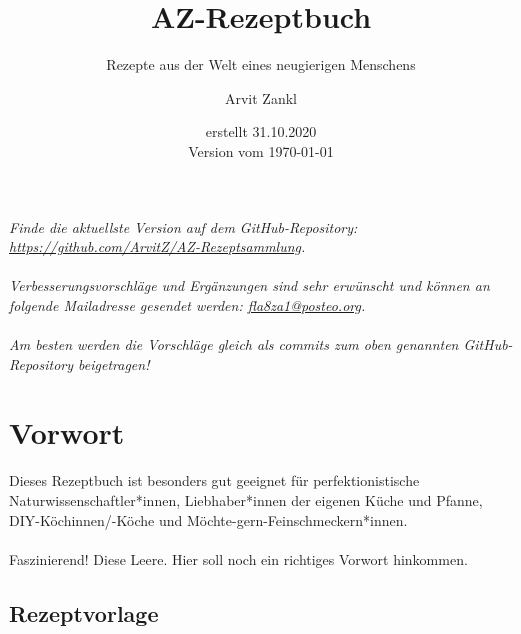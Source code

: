 \documentclass[a4paper, 12pt]{scrbook} 								%
\title{AZ-Rezeptbuch}
\subtitle{Rezepte aus der Welt eines neugierigen Menschens}
\author{Arvit Zankl}
\date{erstellt 31.10.2020  \\\vspace{1cm} Version vom \today}
\numberwithin{equation}{section} 									%
\begin{document}
\maketitle

\newpage

\textit{
Finde die aktuellste Version auf dem GitHub-Repository: \\\href{https://github.com/ArvitZ/AZ-Rezeptsammlung}{https://github.com/ArvitZ/AZ-Rezeptsammlung}. \\\\
Verbesserungsvorschläge und Ergänzungen sind sehr erwünscht und können an folgende Mailadresse gesendet werden: \href{mailto:fla8za1@posteo.org}{fla8za1@posteo.org}. \\\\
Am besten werden die Vorschläge gleich als commits zum oben genannten GitHub-Repository beigetragen!
}

\thispagestyle{empty}	%
\tableofcontents

\newpage
\listoftodos


\chapter{Vorwort}
	\setcounter{page}{1}
	Dieses Rezeptbuch ist besonders gut geeignet für perfektionistische Naturwissenschaftler*innen, Liebhaber*innen der eigenen Küche und Pfanne, DIY-Köchinnen/-Köche und Möchte-gern-Feinschmeckern*innen.	
\\
\\
	Faszinierend! Diese Leere. Hier soll noch ein richtiges Vorwort hinkommen.
	\newpage



\section{Rezeptvorlage}	\label{Rezeptlabel}
\end{document}
